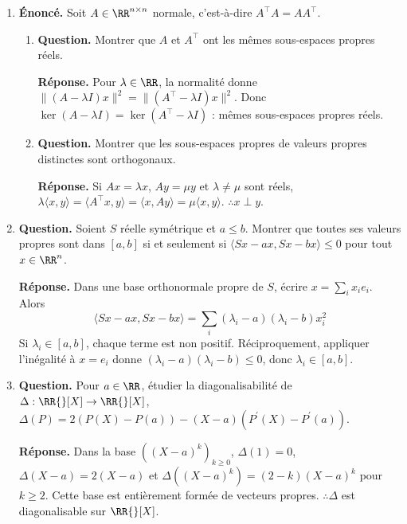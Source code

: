 \documentclass[12pt, a4paper]{article}
\begin{document}
\begin{enumerate}[label=9.\arabic*., start=94]
  \item \begin{minipage}[t]{\linewidth}\raggedright
\textbf{Énoncé.} Soit $A\in\RR^{n\times n}$ normale, c’est-à-dire $A^\top A=AA^\top$.

\begin{enumerate}[\arabic*.]
        \item \textbf{Question.} Montrer que $A$ et $A^\top$ ont les mêmes sous-espaces propres réels.
\par\smallskip
\textbf{Réponse.} Pour $\lambda\in\RR$, la normalité donne
        $\|(A-\lambda I)x\|^2=\|(A^\top-\lambda I)x\|^2$.
        Donc $\ker(A-\lambda I)=\ker(A^\top-\lambda I)$ : mêmes sous-espaces propres réels.

  \item \textbf{Question.} Montrer que les sous-espaces propres de valeurs propres distinctes sont orthogonaux.
\par\smallskip
\textbf{Réponse.} Si $Ax=\lambda x$, $Ay=\mu y$ et $\lambda\neq\mu$ sont réels,
        $\lambda\langle x,y\rangle=\langle A^\top x,y\rangle=\langle x,Ay\rangle=\mu\langle x,y\rangle$.
        $\therefore x\perp y$.

\end{enumerate}
\end{minipage}

  \item \begin{minipage}[t]{\linewidth}\raggedright
\textbf{Question.} Soient $S$ réelle symétrique et $a\leq b$. Montrer que toutes ses valeurs propres sont dans $[a,b]$ si et seulement si $\langle Sx-ax,Sx-bx\rangle\leq0$ pour tout $x\in\RR^n$.
\par\smallskip
\textbf{Réponse.} Dans une base orthonormale propre de $S$, écrire $x=\sum_i x_ie_i$.
    Alors
    \[
      \langle Sx-ax,Sx-bx\rangle=\sum_i(\lambda_i-a)(\lambda_i-b)x_i^2
    \]
    Si $\lambda_i\in[a,b]$, chaque terme est non positif.
    Réciproquement, appliquer l'inégalité à $x=e_i$ donne $(\lambda_i-a)(\lambda_i-b)\leq0$, donc $\lambda_i\in[a,b]$.
\end{minipage}

  \item \begin{minipage}[t]{\linewidth}\raggedright
\textbf{Question.} Pour $a\in\RR$, étudier la diagonalisabilité de $\Delta:\RR{}[X]\to\RR{}[X]$, $\Delta(P)=2(P(X)-P(a))-(X-a)(P^{\prime}(X)-P^{\prime}(a))$.
\par\smallskip
\textbf{Réponse.} Dans la base $((X-a)^k)_{k\geq0}$,
    $\Delta(1)=0$, $\Delta(X-a)=2(X-a)$ et
    $\Delta((X-a)^k)=(2-k)(X-a)^k$ pour $k\geq2$.
    Cette base est entièrement formée de vecteurs propres.
    $\therefore\Delta$ est diagonalisable sur $\RR{}[X]$.
\end{minipage}


\end{enumerate}
\end{document}
